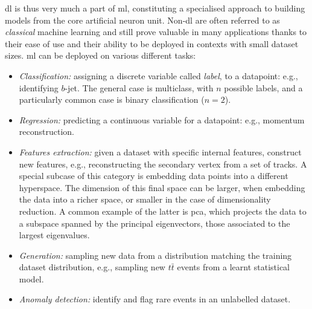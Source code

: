 \gls{dl} is thus very much a part of \gls{ml}, constituting a specialised approach to building models from the core artificial neuron unit. Non-\gls{dl} are often referred to as \textit{classical} machine learning and still prove valuable in many applications thanks to their ease of use and their ability to be deployed in contexts with small dataset sizes. \gls{ml} can be deployed on various different tasks: 
\begin{itemize}
    \item \textit{Classification:} assigning a discrete variable called \textit{label}, to a datapoint: e.g., identifying $b$-jet. The general case is multiclass, with $n$ possible labels, and a particularly common case is binary classification ($n = 2$).
    \item \textit{Regression:} predicting a continuous variable for a datapoint: e.g., momentum reconstruction. 
    \item \textit{Features extraction:} given a dataset with specific internal features, construct new features, e.g., reconstructing the secondary vertex from a set of tracks. A special subcase of this category is embedding data points into a different hyperspace. The dimension of this final space can be larger, when embedding the data into a richer space, or smaller in the case of dimensionality reduction. A common example of the latter is \gls{pca}, which projects the data to a subspace spanned by the principal eigenvectors, those associated to the largest eigenvalues.
    \item \textit{Generation:} sampling new data from a distribution matching the training dataset distribution, e.g., sampling new $t\bar{t}$ events from a learnt statistical model. 
    \item \textit{Anomaly detection:} identify and flag rare events in an unlabelled dataset.
\end{itemize}

